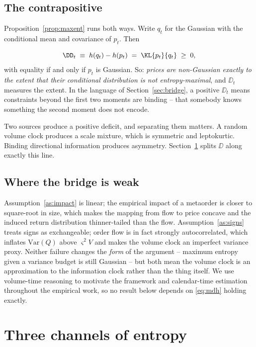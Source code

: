 \subsection{The contrapositive}
\label{sec:contrapositive}

Proposition~\ref{prop:maxent} runs both ways. Write $q_t$ for the Gaussian with
the conditional mean and covariance of $p_t$. Then

\begin{equation}
\label{eq:deficit}
\DD_t \;\equiv\; h(q_t) - h(p_t) \;=\; \KL{p_t}{q_t} \;\ge\; 0,
\end{equation}
with equality if and only if $p_t$ is Gaussian. So: \emph{prices are non-Gaussian
exactly to the extent that their conditional distribution is not
entropy-maximal}, and $\DD_t$ measures the extent. In the language of
Section~\ref{sec:bridge}, a positive $\DD_t$ means constraints beyond the first
two moments are binding -- that somebody knows something the second moment does
not encode.

Two sources produce a positive deficit, and separating them matters. A random
volume clock produces a scale mixture, which is symmetric and leptokurtic.
Binding directional information produces asymmetry. Section~\ref{sec:channels}
splits $\DD$ along exactly this line.

\subsection{Where the bridge is weak}
\label{sec:bridge-caveats}

Assumption~\ref{as:impact} is linear; the empirical impact of a metaorder is
closer to square-root in size, which makes the mapping from flow to price
concave and the induced return distribution thinner-tailed than the flow.
Assumption~\ref{as:signs} treats signs as exchangeable; order flow is in fact
strongly autocorrelated, which inflates $\mathrm{Var}(Q)$ above $\varsigma^2 V$
and makes the volume clock an imperfect variance proxy. Neither failure changes
the \emph{form} of the argument -- maximum entropy given a variance budget is
still Gaussian -- but both mean the volume clock is an approximation to the
information clock rather than the thing itself. We use volume-time reasoning to
motivate the framework and calendar-time estimation throughout the empirical
work, so no result below depends on \eqref{eq:mdh} holding exactly.

\section{Three channels of entropy}
\label{sec:channels}

